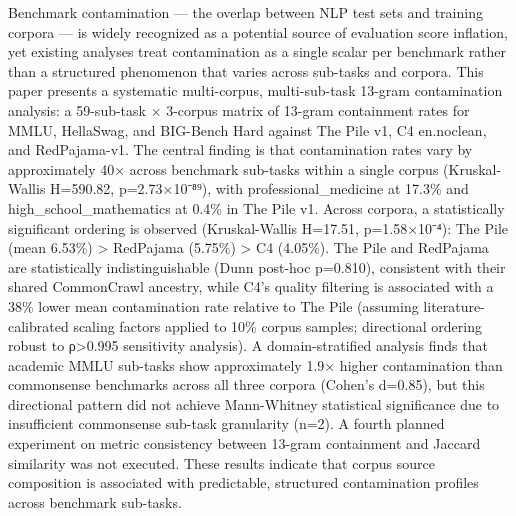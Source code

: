 
Benchmark contamination — the overlap between NLP test sets and training corpora — is widely recognized as a potential source of evaluation score inflation, yet existing analyses treat contamination as a single scalar per benchmark rather than a structured phenomenon that varies across sub-tasks and corpora. This paper presents a systematic multi-corpus, multi-sub-task 13-gram contamination analysis: a 59-sub-task × 3-corpus matrix of 13-gram containment rates for MMLU, HellaSwag, and BIG-Bench Hard against The Pile v1, C4 en.noclean, and RedPajama-v1. The central finding is that contamination rates vary by approximately 40× across benchmark sub-tasks within a single corpus (Kruskal-Wallis H=590.82, p=2.73×10⁻⁸⁹), with professional_medicine at 17.3\% and high_school_mathematics at 0.4\% in The Pile v1. Across corpora, a statistically significant ordering is observed (Kruskal-Wallis H=17.51, p=1.58×10⁻⁴): The Pile (mean 6.53\%) > RedPajama (5.75\%) > C4 (4.05\%). The Pile and RedPajama are statistically indistinguishable (Dunn post-hoc p=0.810), consistent with their shared CommonCrawl ancestry, while C4's quality filtering is associated with a 38\% lower mean contamination rate relative to The Pile (assuming literature-calibrated scaling factors applied to 10\% corpus samples; directional ordering robust to ρ>0.995 sensitivity analysis). A domain-stratified analysis finds that academic MMLU sub-tasks show approximately 1.9× higher contamination than commonsense benchmarks across all three corpora (Cohen's d=0.85), but this directional pattern did not achieve Mann-Whitney statistical significance due to insufficient commonsense sub-task granularity (n=2). A fourth planned experiment on metric consistency between 13-gram containment and Jaccard similarity was not executed. These results indicate that corpus source composition is associated with predictable, structured contamination profiles across benchmark sub-tasks.

